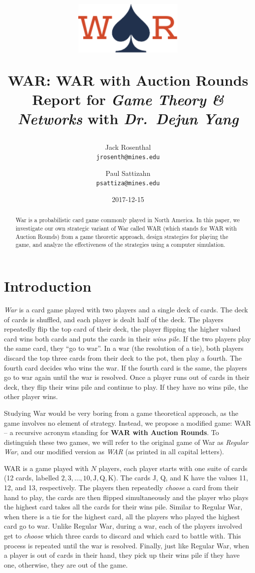 \documentclass[conference]{IEEEtran}
\title{%
\begin{center}
    \includegraphics[width=0.4\textwidth]{graphics/war.pdf}
\end{center}
\textbf{WAR: WAR with Auction Rounds} \\
{\large Report for \emph{Game Theory \& Networks} with \emph{Dr.~Dejun Yang}}
}
\author{
    Jack Rosenthal \\
    \texttt{jrosenth@mines.edu}
    \and Paul Sattizahn \\
    \texttt{psattiza@mines.edu}}
\date{2017-12-15}
\begin{document}
\maketitle
\thispagestyle{plain}
\pagestyle{plain}

\begin{abstract}
    War is a probabilistic card game commonly played in North America. In this
    paper, we investigate our own strategic variant of War called WAR (which
    stands for WAR with Auction Rounds) from a game theoretic approach, design
    strategies for playing the game, and analyze the effectiveness of the
    strategies using a computer simulation.
\end{abstract}

\section{Introduction}

\emph{War} is a card game played with two players and a single deck of cards.
The deck of cards is shuffled, and each player is dealt half of the deck. The
players repeatedly flip the top card of their deck, the player flipping the
higher valued card wins both cards and puts the cards in their \emph{wins
pile}. If the two players play the same card, they ``go to war''. In a war (the
resolution of a tie), both players discard the top three cards from their deck
to the pot, then play a fourth. The fourth card decides who wins the war. If
the fourth card is the same, the players go to war again until the war is
resolved. Once a player runs out of cards in their deck, they flip their wins
pile and continue to play. If they have no wins pile, the other player wins.

Studying War would be very boring from a game theoretical approach, as the game
involves no element of strategy. Instead, we propose a modified game: WAR -- a
recursive acronym standing for \textbf{WAR with Auction Rounds}. To distinguish
these two games, we will refer to the original game of War as \emph{Regular
War}, and our modified version as \emph{WAR} (as printed in all capital
letters).

WAR is a game played with $N$ players, each player starts with one suite of
cards (12 cards, labelled $2, 3, \ldots, 10, \mathrm{J}, \mathrm{Q},
\mathrm{K}$). The cards J, Q, and K have the values 11, 12, and 13,
respectively. The players then repeatedly \emph{choose} a card from
their hand to play, the cards are then flipped simultaneously and the player
who plays the highest card takes all the cards for their wins pile. Similar to
Regular War, when there is a tie for the highest card, all the players who
played the highest card go to war. Unlike Regular War, during a war, each of
the players involved get to \emph{choose} which three cards to discard and
which card to battle with. This process is repeated until the war is resolved.
Finally, just like Regular War, when a player is out of cards in their hand,
they pick up their wins pile if they have one, otherwise, they are out of the
game.
\end{document}
